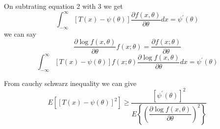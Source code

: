 \documentclass{beamer}
\begin{document}
\begin{frame}
On subtrating equation 2 with 3 we get
\begin{equation}
     \int_{-\infty}^{\infty}[T(x)-\psi(\theta)]\dfrac{{\partial}f(x,{\theta})}{{\partial}{\theta}}dx = {\psi}^{'}({\theta})
\end{equation}
we can say
\begin{equation}
    \dfrac{{\partial}{\log}f(x,{\theta})}{{\partial}{\theta}}f(x;{\theta}) = \dfrac{{\partial}f(x;{\theta})}{{\partial}{\theta}}
\end{equation}
\begin{equation}
     \int_{-\infty}^{\infty}[T(x)-\psi(\theta)]f(x;{\theta})\dfrac{{\partial}{\log}f(x,{\theta})}{{\partial}{\theta}}dx = {\psi}^{'}({\theta})
\end{equation}
\end{frame}

\begin{frame}
From cauchy schwarz inequality we can give
\begin{equation*}
    E[[{T(x)-{\psi}(\theta)}]^2] \geq \dfrac{[{\psi}^{'}({\theta})]^{2}}{E \left\{ \left(\dfrac{{\partial}{\log}f(x,{\theta})}{{\partial}{\theta}}\right)^2 \right\}}
\end{equation*}

\end{frame}
\end{document}
